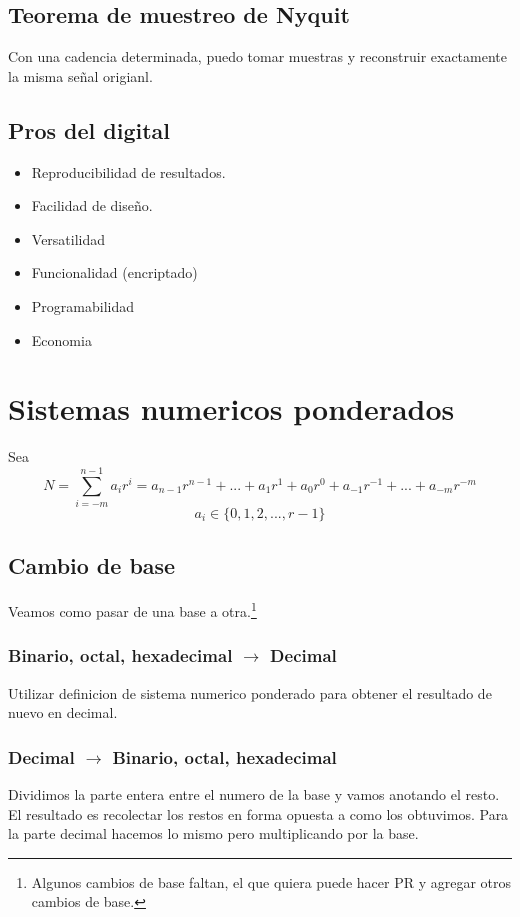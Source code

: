 \documentclass{report}
\begin{document}
\section{Teorema  de muestreo de Nyquit}

Con una cadencia determinada, puedo tomar muestras y reconstruir exactamente la misma señal origianl.

\section{Pros del digital}
\begin{itemize}
	\item Reproducibilidad de resultados.
	\item Facilidad de diseño.
	\item Versatilidad
	\item Funcionalidad (encriptado)
	\item Programabilidad
	\item Economia
\end{itemize}

\chapter{Sistemas numericos ponderados}

Sea $$N = \sum_{i=-m}^{n-1} a_i r^i= a_{n-1}r^{n-1}+...+a_1r^1+a_0r^0+a_{-1}r^{-1}+...+a_{-m}r^{-m}$$
$$a_i \in \{0,1,2,...,r-1\}$$

\section{Cambio de base}
Veamos como pasar de una base a otra.\footnote{Algunos cambios de base faltan, el que quiera puede hacer PR y agregar otros cambios de base.}
\subsection{Binario, octal, hexadecimal $\to$ Decimal}

Utilizar definicion de sistema numerico ponderado para obtener el resultado de nuevo en decimal.

\subsection{Decimal $\to$ Binario, octal, hexadecimal}

Dividimos la parte entera entre el numero de la base y vamos anotando el resto.
El resultado es recolectar los restos en forma opuesta a como los obtuvimos.
Para la parte decimal hacemos lo mismo pero multiplicando por la base.
\end{document}

